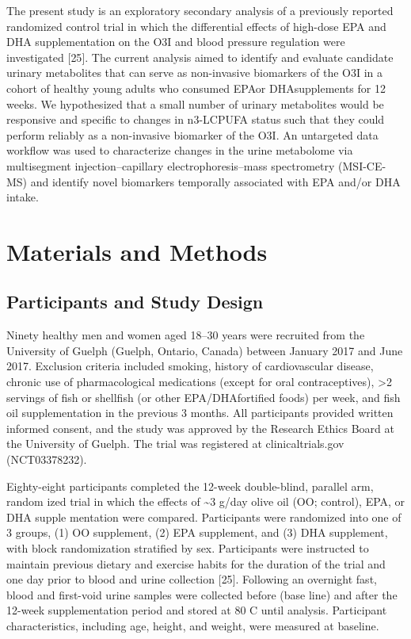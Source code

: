 \documentclass[journal=jacsat,manuscript=article]{achemso}
\begin{document}
The present study is an exploratory secondary analysis of a previously
reported randomized control trial in which the differential effects of
high-dose EPA and DHA supplementation on the O3I and blood pressure
regulation were investigated {[}25{]}. The current analysis aimed to
identify and evaluate candidate urinary metabolites that can serve as
non-invasive biomarkers of the O3I in a cohort of healthy young adults
who consumed EPAor DHAsupplements for 12 weeks. We hypothesized that a
small number of urinary metabolites would be responsive and specific to
changes in n3-LCPUFA status such that they could perform reliably as a
non-invasive biomarker of the O3I. An untargeted data workflow was used
to characterize changes in the urine metabolome via multisegment
injection--capillary electrophoresis--mass spectrometry (MSI-CE-MS) and
identify novel biomarkers temporally associated with EPA and/or DHA
intake.

\section{Materials and Methods}\label{materials-and-methods}

\subsection{Participants and Study
Design}\label{participants-and-study-design}

Ninety healthy men and women aged 18--30 years were recruited from the
University of Guelph (Guelph, Ontario, Canada) between January 2017 and
June 2017. Exclusion criteria included smoking, history of
cardiovascular disease, chronic use of pharmacological medications
(except for oral contraceptives), \textgreater2 servings of fish or
shellfish (or other EPA/DHAfortified foods) per week, and fish oil
supplementation in the previous 3 months. All participants provided
written informed consent, and the study was approved by the Research
Ethics Board at the University of Guelph. The trial was registered at
clinicaltrials.gov (NCT03378232).

Eighty-eight participants completed the 12-week double-blind, parallel
arm, random ized trial in which the effects of \textasciitilde3 g/day
olive oil (OO; control), EPA, or DHA supple mentation were compared.
Participants were randomized into one of 3 groups, (1) OO supplement,
(2) EPA supplement, and (3) DHA supplement, with block randomization
stratified by sex. Participants were instructed to maintain previous
dietary and exercise habits for the duration of the trial and one day
prior to blood and urine collection {[}25{]}. Following an overnight
fast, blood and first-void urine samples were collected before (base
line) and after the 12-week supplementation period and stored at 80 C
until analysis. Participant characteristics, including age, height, and
weight, were measured at baseline.
\end{document}
